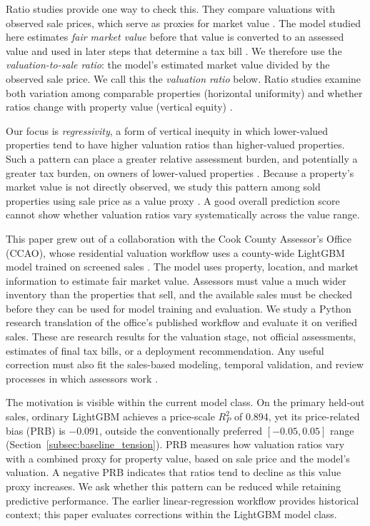 \documentclass[10pt]{article}
\theoremstyle{definition}
\newcommand{\1}{\mathbf{1}}
\begin{document}
Ratio studies provide one way to check this. They compare valuations with observed sale prices, which serve as proxies for market value \cite{IAAO2013Ratio,IAAO2025Mass}. The model studied here estimates \emph{fair market value} before that value is converted to an assessed value and used in later steps that determine a tax bill \cite{CCAOModelResAVM2026,CCAOAssessmentNotice2026,CCAOPropertyTaxSystem2026}. We therefore use the \emph{valuation-to-sale ratio}: the model's estimated market value divided by the observed sale price. We call this the \emph{valuation ratio} below. Ratio studies examine both variation among comparable properties (horizontal uniformity) and whether ratios change with property value (vertical equity) \cite{IAAO2013Ratio,IAAO2025Mass,IAAO2026ExposureRatio}.

Our focus is \emph{regressivity}, a form of vertical inequity in which lower-valued properties tend to have higher valuation ratios than higher-valued properties. Such a pattern can place a greater relative assessment burden, and potentially a greater tax burden, on owners of lower-valued properties \cite{McMillen2020,Berry2021,AvenancioLeonHoward2022}. Because a property's market value is not directly observed, we study this pattern among sold properties using sale price as a value proxy \cite{IAAO2026ExposureRatio}. A good overall prediction score cannot show whether valuation ratios vary systematically across the value range.

This paper grew out of a collaboration with the Cook County Assessor's Office (CCAO), whose residential valuation workflow uses a county-wide LightGBM model trained on screened sales \cite{CCAOModelResAVM2026,lightgbm}. The model uses property, location, and market information to estimate fair market value. Assessors must value a much wider inventory than the properties that sell, and the available sales must be checked before they can be used for model training and evaluation. We study a Python research translation of the office's published workflow and evaluate it on verified sales. These are research results for the valuation stage, not official assessments, estimates of final tax bills, or a deployment recommendation. Any useful correction must also fit the sales-based modeling, temporal validation, and review processes in which assessors work \cite{IAAO2020SalesVerification,IAAO2018AVM,IAAO2025Mass}.

The motivation is visible within the current model class. On the primary held-out sales, ordinary LightGBM achieves a price-scale $R^2_P$ of 0.894, yet its price-related bias (PRB) is $-0.091$, outside the conventionally preferred $[-0.05,0.05]$ range (Section~\ref{subsec:baseline_tension}). PRB measures how valuation ratios vary with a combined proxy for property value, based on sale price and the model's valuation. A negative PRB indicates that ratios tend to decline as this value proxy increases. We ask whether this pattern can be reduced while retaining predictive performance. The earlier linear-regression workflow provides historical context; this paper evaluates corrections within the LightGBM model class.
\end{document}

